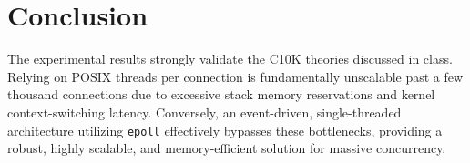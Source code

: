 \documentclass[11pt,a4paper]{article}
\begin{document}
\section{Conclusion}
The experimental results strongly validate the C10K theories discussed in class. Relying on POSIX threads per connection is fundamentally unscalable past a few thousand connections due to excessive stack memory reservations and kernel context-switching latency. Conversely, an event-driven, single-threaded architecture utilizing \texttt{epoll} effectively bypasses these bottlenecks, providing a robust, highly scalable, and memory-efficient solution for massive concurrency.
\end{document}
